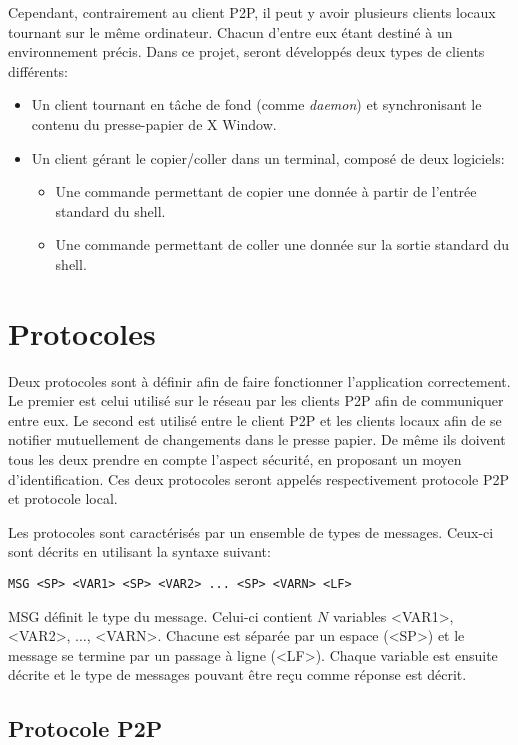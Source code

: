 Cependant, contrairement au client P2P, il peut y avoir plusieurs clients
locaux tournant sur le même ordinateur. Chacun d'entre eux étant destiné
à un environnement précis. Dans ce projet, seront développés deux types
de clients différents:
\begin{itemize}
\item Un client tournant en tâche de fond (comme \emph{daemon}) et
  synchronisant le contenu du presse-papier de X Window.
\item Un client gérant le copier/coller dans un terminal, composé de deux
  logiciels:
  \begin{itemize}
  \item Une commande permettant de copier une donnée à partir de l'entrée
    standard du shell.
  \item Une commande permettant de coller une donnée sur la sortie standard
    du shell.
  \end{itemize}
\end{itemize}

\section{Protocoles}
Deux protocoles sont à définir afin de faire fonctionner l'application
correctement. Le premier est celui utilisé sur le réseau par les clients
P2P afin de communiquer entre eux. Le second est utilisé entre le client
P2P et les clients locaux afin de se notifier mutuellement de changements
dans le presse papier. De même ils doivent tous les deux prendre en compte
l'aspect sécurité, en proposant un moyen d'identification.
Ces deux protocoles seront appelés respectivement protocole P2P et protocole
local.

Les protocoles sont caractérisés par un ensemble de types de messages.
Ceux-ci sont décrits en utilisant la syntaxe suivant:
\begin{verbatim}
MSG <SP> <VAR1> <SP> <VAR2> ... <SP> <VARN> <LF>
\end{verbatim}
MSG définit le type du message. Celui-ci contient $N$ variables
<VAR1>, <VAR2>, $\ldots$, <VARN>. Chacune est séparée par un espace (<SP>)
et le message se termine par un passage à ligne (<LF>). Chaque variable est
ensuite décrite et le type de messages pouvant être reçu comme réponse est
décrit.

\subsection{Protocole P2P}
